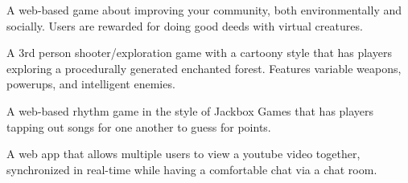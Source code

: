 \documentclass[10pt,a4paper,ragged2e,withhyper]{altacv}
\begin{document}
\begin{paracol}{2}
\divider{}

\small{}A web-based game about improving your community, both environmentally and socially.
Users are rewarded for doing good deeds with virtual creatures.

\divider{}

\small{}A 3rd person shooter/exploration game with a cartoony style that has players exploring a procedurally generated enchanted forest.
Features variable weapons, powerups, and intelligent enemies.

\divider{}

\small{}A web-based rhythm game in the style of Jackbox Games that has players tapping out songs for one another to guess for points.

\divider{}

\small{}A web app that allows multiple users to view a youtube video together, synchronized in real-time while having a comfortable chat via a chat room.

\divider{}

\medskip




\switchcolumn{}

\divider{}

\divider{}

\divider{}

\divider{}

\divider{}

\divider{}

\divider{}

\divider{}

\divider{}


\divider{}


\end{paracol}
\end{document}
